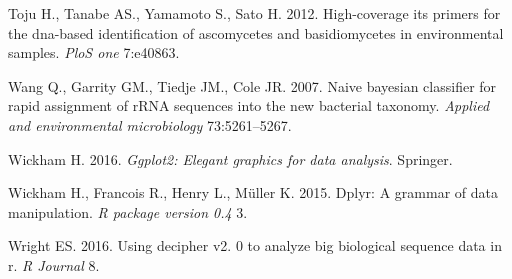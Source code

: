 \documentclass[11pt,]{article}
\begin{document}
\hypertarget{ref-toju2012high}{}
Toju H., Tanabe AS., Yamamoto S., Sato H. 2012. High-coverage its
primers for the dna-based identification of ascomycetes and
basidiomycetes in environmental samples. \emph{PloS one} 7:e40863.

\hypertarget{ref-wang2007naive}{}
Wang Q., Garrity GM., Tiedje JM., Cole JR. 2007. Naive bayesian
classifier for rapid assignment of rRNA sequences into the new bacterial
taxonomy. \emph{Applied and environmental microbiology} 73:5261--5267.

\hypertarget{ref-wickham2016ggplot2}{}
Wickham H. 2016. \emph{Ggplot2: Elegant graphics for data analysis}.
Springer.

\hypertarget{ref-wickham2015dplyr}{}
Wickham H., Francois R., Henry L., Müller K. 2015. Dplyr: A grammar of
data manipulation. \emph{R package version 0.4} 3.

\hypertarget{ref-wright2016using}{}
Wright ES. 2016. Using decipher v2. 0 to analyze big biological sequence
data in r. \emph{R Journal} 8.




\newpage
\singlespacing 
\end{document}
